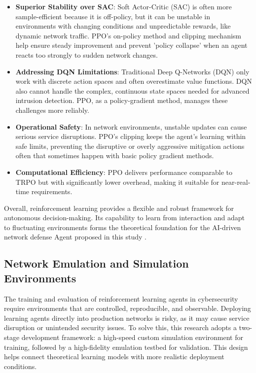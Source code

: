 \documentclass[12pt,a4paper]{report}
\begin{document}
\begin{itemize}
    \item \textbf{Superior Stability over SAC}: Soft Actor-Critic (SAC) is often more sample-efficient because it is off-policy, but it can be unstable in environments with changing conditions and unpredictable rewards, like dynamic network traffic. PPO’s on-policy method and clipping mechanism help ensure steady improvement and prevent 'policy collapse' when an agent reacts too strongly to sudden network changes.
    \item \textbf{Addressing DQN Limitations}: Traditional Deep Q-Networks (DQN) only work with discrete action spaces and often overestimate value functions. DQN also cannot handle the complex, continuous state spaces needed for advanced intrusion detection. PPO, as a policy-gradient method, manages these challenges more reliably.
    \item \textbf{Operational Safety}: In network environments, unstable updates can cause serious service disruptions. PPO’s clipping keeps the agent’s learning within safe limits, preventing the disruptive or overly aggressive mitigation actions often that sometimes happen with basic policy gradient methods.
    \item \textbf{Computational Efficiency}: PPO delivers performance comparable to TRPO but with significantly lower overhead, making it suitable for near-real-time requirements.
\end{itemize}

Overall, reinforcement learning provides a flexible and robust framework for autonomous decision-making. Its capability to learn from interaction and adapt to fluctuating environments forms the theoretical foundation for the AI-driven network defense Agent proposed in this study \cite{schulmanPPO2017}.

\subsection{Network Emulation and Simulation Environments}

The training and evaluation of reinforcement learning agents in cybersecurity require environments that are controlled, reproducible, and observable. Deploying learning agents directly into production networks is risky, as it may cause service disruption or unintended security issues. To solve this, this research adopts a two-stage development framework: a high-speed custom simulation environment for training, followed by a high-fidelity emulation testbed for validation. This design helps connect theoretical learning models with more realistic deployment conditions.
\end{document}
